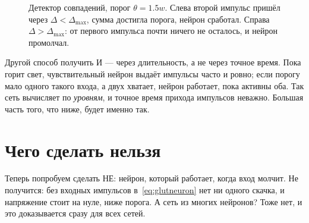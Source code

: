 \begin{figure}[t]
\centering
{}
\caption{Детектор совпадений, порог $\theta=1.5w$. Слева второй импульс пришёл через $\Delta<\Delta_{\max}$, сумма достигла порога, нейрон сработал. Справа $\Delta>\Delta_{\max}$: от первого импульса почти ничего не осталось, и нейрон промолчал.}
\label{fig:coincidence}
\end{figure}

Другой способ получить И --- через длительность, а не через точное время. Пока горит свет, чувствительный нейрон выдаёт импульсы часто и ровно; если порогу мало одного такого входа, а двух хватает, нейрон работает, пока активны оба. Так сеть вычисляет по \emph{уровням}, и точное время прихода импульсов неважно. Большая часть того, что ниже, будет именно так.

\section{Чего сделать нельзя}

Теперь попробуем сделать НЕ: нейрон, который работает, когда вход молчит. Не получится: без входных импульсов в~\eqref{eq:glutneuron} нет ни одного скачка, и напряжение стоит на нуле, ниже порога. А сеть из многих нейронов? Тоже нет, и это доказывается сразу для всех сетей.

